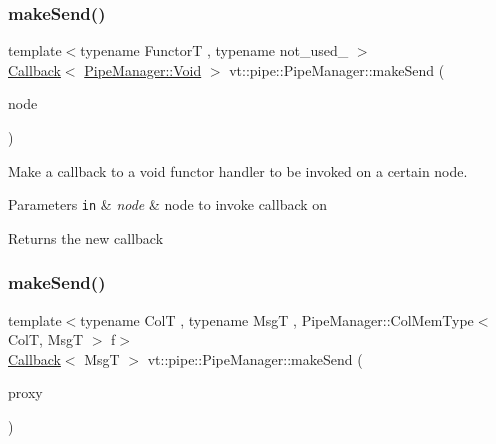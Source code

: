 \subsubsection{\texorpdfstring{make\+Send()}{makeSend()}\hspace{0.1cm}{\footnotesize\ttfamily [3/6]}}
{\footnotesize\ttfamily template$<$typename FunctorT , typename not\+\_\+used\+\_\+ $>$ \\
\hyperlink{namespacevt_a36db99df4c973d48b1118a293fff533f}{Callback}$<$ \hyperlink{structvt_1_1pipe_1_1_pipe_manager_ab720c2580ecfd3ab36e49aeaaff64cc6}{Pipe\+Manager\+::\+Void} $>$ vt\+::pipe\+::\+Pipe\+Manager\+::make\+Send (\begin{DoxyParamCaption}\item[{\hyperlink{namespacevt_a866da9d0efc19c0a1ce79e9e492f47e2}{Node\+Type} const \&}]{node }\end{DoxyParamCaption})}



Make a callback to a void functor handler to be invoked on a certain node. 


\begin{DoxyParams}[1]{Parameters}
\mbox{\tt in}  & {\em node} & node to invoke callback on\\
\hline
\end{DoxyParams}
\begin{DoxyReturn}{Returns}
the new callback 
\end{DoxyReturn}
\mbox{\label{structvt_1_1pipe_1_1_pipe_manager_a612b59953b949edc575577e313e3b187}} 
\subsubsection{\texorpdfstring{make\+Send()}{makeSend()}\hspace{0.1cm}{\footnotesize\ttfamily [4/6]}}
{\footnotesize\ttfamily template$<$typename ColT , typename MsgT , Pipe\+Manager\+::\+Col\+Mem\+Type$<$ Col\+T, Msg\+T $>$ f$>$ \\
\hyperlink{namespacevt_a36db99df4c973d48b1118a293fff533f}{Callback}$<$ MsgT $>$ vt\+::pipe\+::\+Pipe\+Manager\+::make\+Send (\begin{DoxyParamCaption}\item[{typename Col\+T\+::\+Proxy\+Type}]{proxy }\end{DoxyParamCaption})}



